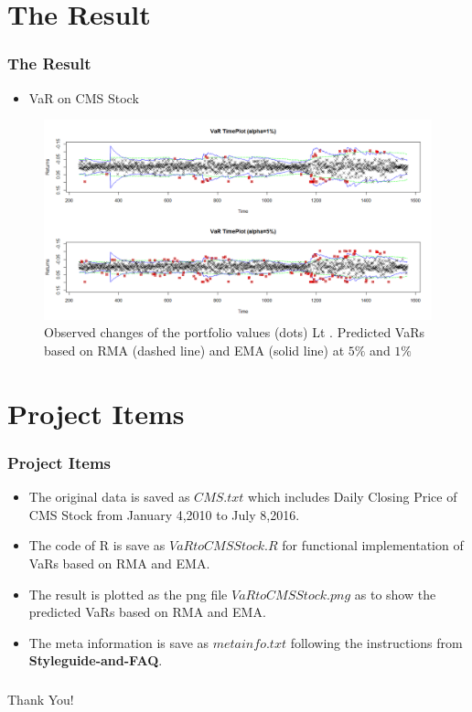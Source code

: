 \documentclass[12pt]{beamer}
\begin{document}
\section{The Result}
\begin{frame}
	\frametitle{\textbf{The Result}}
	\begin{itemize}

		\item VaR on CMS Stock
	\end{itemize}
\begin{figure}
\includegraphics[scale=0.27]{VaRtoCMSStock.png}
\caption{Observed changes of the portfolio values (dots) Lt . Predicted
VaRs based on RMA (dashed line) and EMA (solid line) at $5\%$ and $1\%$}
    \end{figure}
\end{frame}


\section{Project Items}
	\begin{frame}
		\frametitle{Project Items}
\begin{itemize}
		\item The original data is saved as $CMS.txt$ which includes Daily Closing Price of CMS Stock from January 4,2010 to July 8,2016.
\
        \item The code of R is save as $VaRtoCMSStock.R$ for functional implementation of VaRs based on RMA and EMA.
            \
        \item The result is plotted as the png file $VaRtoCMSStock.png$ as to show the predicted
VaRs based on RMA and EMA.\
        \item The meta information is save as $metainfo.txt$ following the instructions from \textbf{Styleguide-and-FAQ}.

	\end{itemize}
\end{frame}
	\begin{frame}
		\frametitle{ }
		\Huge{\centerline{Thank You!}}

	\end{frame}
	
	
\end{document}
